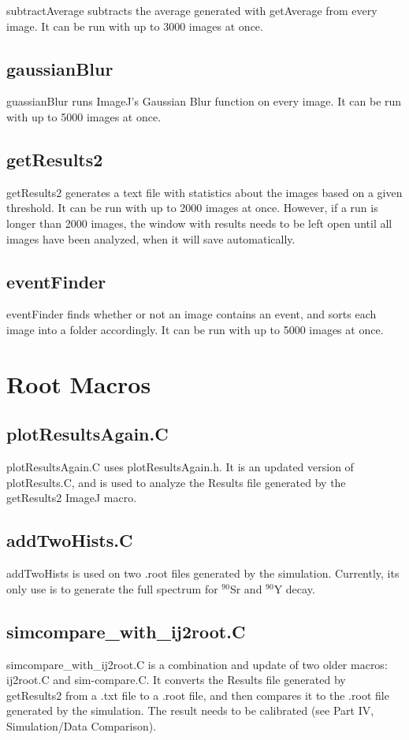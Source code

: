 \documentclass[a4paper,10pt]{article}
\begin{document}
subtractAverage subtracts the average generated with getAverage from every image. It can be run with up to 3000 images at once.

\subsection{gaussianBlur}

guassianBlur runs ImageJ's Gaussian Blur function on every image. It can be run with up to 5000 images at once. 

\subsection{getResults2}

getResults2 generates a text file with statistics about the images based on a given threshold. It can be run with up to 2000 images at once. However, if a run is longer than 2000 images, the window with results needs to be left open until all images have been analyzed, when it will save automatically. 

\subsection{eventFinder}

eventFinder finds whether or not an image contains an event, and sorts each image into a folder accordingly. It can be run with up to 5000 images at once. 

\section{Root Macros}
\subsection{plotResultsAgain.C}

plotResultsAgain.C uses plotResultsAgain.h. It is an updated version of plotResults.C, and is used to analyze the Results file generated by the getResults2 ImageJ macro. 

\subsection{addTwoHists.C}

addTwoHists is used on two .root files generated by the simulation. Currently, its only use is to generate the full spectrum for $^{90}$Sr and $^{90}$Y decay. 

\subsection{simcompare\_with\_ij2root.C}

simcompare\_with\_ij2root.C is a combination and update of two older macros: ij2root.C and sim-compare.C. It converts the Results file generated by getResults2 from a .txt file to a .root file, and then compares it to the .root file generated by the simulation. The result needs to be calibrated (see Part IV, Simulation/Data Comparison).
\end{document}

